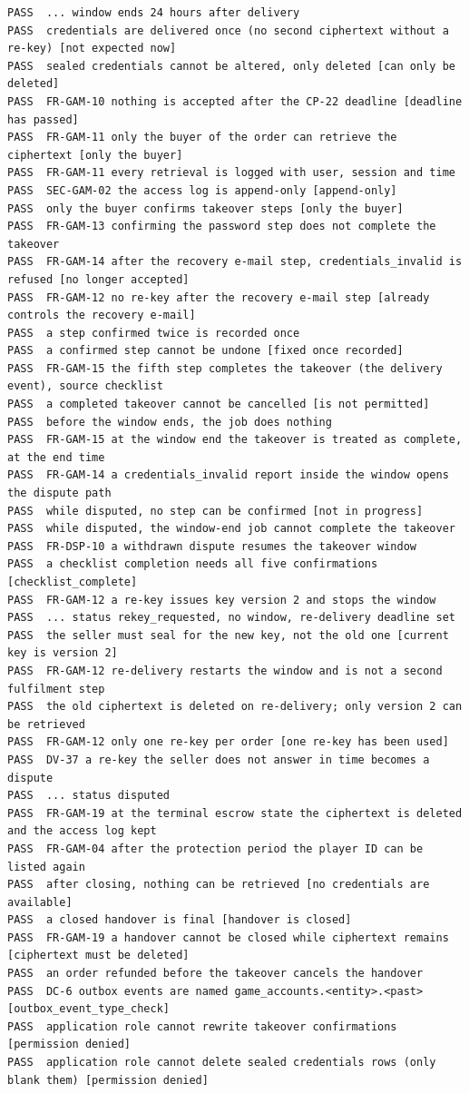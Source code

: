 \documentclass[11pt,a4paper]{article}
\begin{document}
{\begin{verbatim}
PASS  ... window ends 24 hours after delivery
PASS  credentials are delivered once (no second ciphertext without a re-key) [not expected now]
PASS  sealed credentials cannot be altered, only deleted [can only be deleted]
PASS  FR-GAM-10 nothing is accepted after the CP-22 deadline [deadline has passed]
PASS  FR-GAM-11 only the buyer of the order can retrieve the ciphertext [only the buyer]
PASS  FR-GAM-11 every retrieval is logged with user, session and time
PASS  SEC-GAM-02 the access log is append-only [append-only]
PASS  only the buyer confirms takeover steps [only the buyer]
PASS  FR-GAM-13 confirming the password step does not complete the takeover
PASS  FR-GAM-14 after the recovery e-mail step, credentials_invalid is refused [no longer accepted]
PASS  FR-GAM-12 no re-key after the recovery e-mail step [already controls the recovery e-mail]
PASS  a step confirmed twice is recorded once
PASS  a confirmed step cannot be undone [fixed once recorded]
PASS  FR-GAM-15 the fifth step completes the takeover (the delivery event), source checklist
PASS  a completed takeover cannot be cancelled [is not permitted]
PASS  before the window ends, the job does nothing
PASS  FR-GAM-15 at the window end the takeover is treated as complete, at the end time
PASS  FR-GAM-14 a credentials_invalid report inside the window opens the dispute path
PASS  while disputed, no step can be confirmed [not in progress]
PASS  while disputed, the window-end job cannot complete the takeover
PASS  FR-DSP-10 a withdrawn dispute resumes the takeover window
PASS  a checklist completion needs all five confirmations [checklist_complete]
PASS  FR-GAM-12 a re-key issues key version 2 and stops the window
PASS  ... status rekey_requested, no window, re-delivery deadline set
PASS  the seller must seal for the new key, not the old one [current key is version 2]
PASS  FR-GAM-12 re-delivery restarts the window and is not a second fulfilment step
PASS  the old ciphertext is deleted on re-delivery; only version 2 can be retrieved
PASS  FR-GAM-12 only one re-key per order [one re-key has been used]
PASS  DV-37 a re-key the seller does not answer in time becomes a dispute
PASS  ... status disputed
PASS  FR-GAM-19 at the terminal escrow state the ciphertext is deleted and the access log kept
PASS  FR-GAM-04 after the protection period the player ID can be listed again
PASS  after closing, nothing can be retrieved [no credentials are available]
PASS  a closed handover is final [handover is closed]
PASS  FR-GAM-19 a handover cannot be closed while ciphertext remains [ciphertext must be deleted]
PASS  an order refunded before the takeover cancels the handover
PASS  DC-6 outbox events are named game_accounts.<entity>.<past> [outbox_event_type_check]
PASS  application role cannot rewrite takeover confirmations [permission denied]
PASS  application role cannot delete sealed credentials rows (only blank them) [permission denied]


\end{verbatim}}
\end{document}
